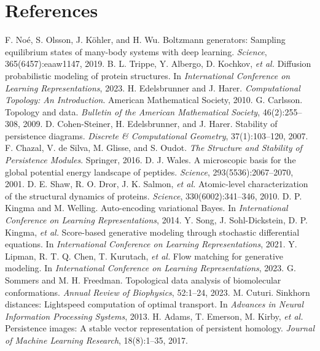 \documentclass[11pt]{article}
\begin{document}
\section*{References}
\begin{thebibliography}{99}
 F. No{\'e}, S. Olsson, J. K{\"o}hler, and H. Wu. Boltzmann generators: Sampling equilibrium states of many-body systems with deep learning. \emph{Science}, 365(6457):eaaw1147, 2019.
 B. L. Trippe, Y. Albergo, D. Kochkov, \emph{et al.} Diffusion probabilistic modeling of protein structures. In \emph{International Conference on Learning Representations}, 2023.
 H. Edelsbrunner and J. Harer. \emph{Computational Topology: An Introduction}. American Mathematical Society, 2010.
 G. Carlsson. Topology and data. \emph{Bulletin of the American Mathematical Society}, 46(2):255--308, 2009.
 D. Cohen-Steiner, H. Edelsbrunner, and J. Harer. Stability of persistence diagrams. \emph{Discrete \& Computational Geometry}, 37(1):103--120, 2007.
 F. Chazal, V. de Silva, M. Glisse, and S. Oudot. \emph{The Structure and Stability of Persistence Modules}. Springer, 2016.
 D. J. Wales. A microscopic basis for the global potential energy landscape of peptides. \emph{Science}, 293(5536):2067--2070, 2001.
 D. E. Shaw, R. O. Dror, J. K. Salmon, \emph{et al.} Atomic-level characterization of the structural dynamics of proteins. \emph{Science}, 330(6002):341--346, 2010.
 D. P. Kingma and M. Welling. Auto-encoding variational Bayes. In \emph{International Conference on Learning Representations}, 2014.
 Y. Song, J. Sohl-Dickstein, D. P. Kingma, \emph{et al.} Score-based generative modeling through stochastic differential equations. In \emph{International Conference on Learning Representations}, 2021.
 Y. Lipman, R. T. Q. Chen, T. Kurutach, \emph{et al.} Flow matching for generative modeling. In \emph{International Conference on Learning Representations}, 2023.
 G. Sommers and M. H. Freedman. Topological data analysis of biomolecular conformations. \emph{Annual Review of Biophysics}, 52:1--24, 2023.
 M. Cuturi. Sinkhorn distances: Lightspeed computation of optimal transport. In \emph{Advances in Neural Information Processing Systems}, 2013.
 H. Adams, T. Emerson, M. Kirby, \emph{et al.} Persistence images: A stable vector representation of persistent homology. \emph{Journal of Machine Learning Research}, 18(8):1--35, 2017.
\end{thebibliography}
\end{document}
